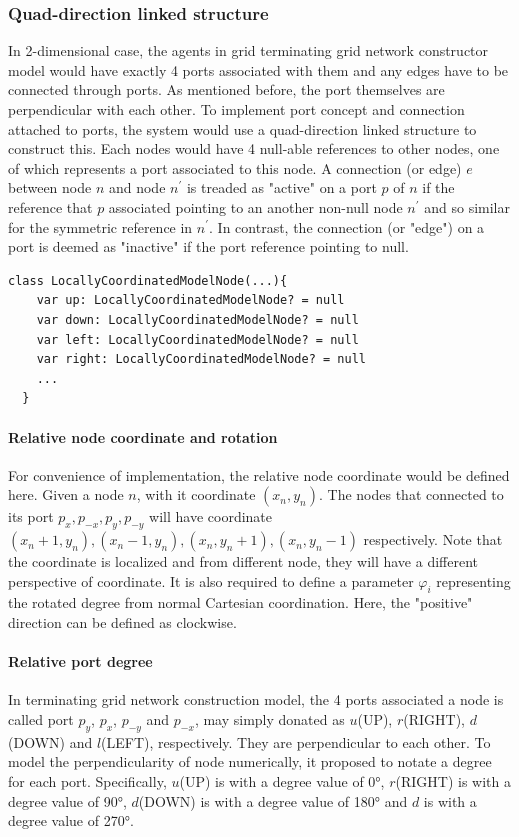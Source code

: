 \subsubsection{Quad-direction linked structure}
In 2-dimensional case, the agents in grid terminating grid network constructor model would have exactly 4 ports associated with them and
any edges have to be connected through ports. As mentioned before, the port themselves are perpendicular with each other.
To implement port concept and connection attached to ports,
the system would use a quad-direction linked structure to construct this. Each nodes would have 4 null-able references to other
nodes, one of which represents a port associated to this node. A connection (or edge) $e$ between node $n$ and node $n^{'}$ is treaded as "active" on a port $p$ of $n$ if the reference that
$p$ associated pointing to an another non-null node $n^{'}$ and so similar for the symmetric reference in $n^{'}$.
In contrast, the connection (or "edge") on a port is deemed as "inactive" if the port reference pointing to null.

\par\noindent
\begin{lstlisting}[caption = {Pseudo-code demonstration of quad-direction linked structure}, style = mykotlin]
  class LocallyCoordinatedModelNode(...){
    var up: LocallyCoordinatedModelNode? = null
    var down: LocallyCoordinatedModelNode? = null
    var left: LocallyCoordinatedModelNode? = null
    var right: LocallyCoordinatedModelNode? = null
    ...
  }
\end{lstlisting}

\paragraph{Relative node coordinate and rotation}
For convenience of implementation, the relative node coordinate would be defined here. Given
a node $n$, with it coordinate $(x_{n}, y_{n})$. The nodes that connected to its port $p_{x}, p_{-x}, p_{y}, p_{-y}$
will have coordinate $(x_{n} + 1, y_{n}), (x_{n} - 1, y_{n}), (x_{n}, y_{n} + 1), (x_{n}, y_{n} - 1)$ respectively.
Note that the coordinate is localized and from different node, they will have a different perspective of coordinate.
It is also required to define a parameter $\varphi_{i}$ representing the rotated degree from normal Cartesian coordination.
Here, the "positive" direction can be defined as clockwise.

\paragraph{Relative port degree}
In terminating grid network construction model, the 4 ports associated a node is called
port $p_{y}$, $p_{x}$, $p_{-y}$ and $p_{-x}$, may simply donated as $u$(UP), $r$(RIGHT), $d$(DOWN) and $l$(LEFT), respectively.
They are perpendicular to each other. To model the perpendicularity of node numerically,
it proposed to notate a degree for each port. Specifically, $u$(UP) is with a degree value of
\ang{0},  $r$(RIGHT) is with a degree value of \ang{90}, $d$(DOWN) is with a degree value of
\ang{180} and $d$ is with a degree value of \ang{270}.

